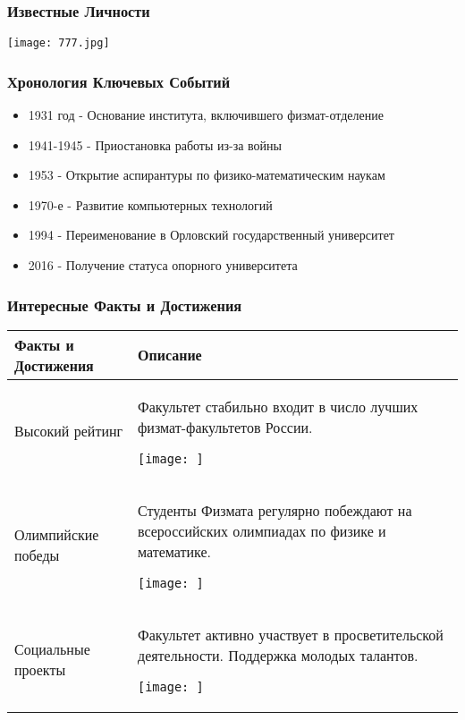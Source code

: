 \documentclass[pdf,hyperref={unicode}, aspectratio=43, serif,11pt]{beamer}
\begin{document}
\begin{frame}
\frametitle{Известные Личности}
\begin{center}
    \texttt{[image: 777.jpg]}
\end{center}
\end{frame}

\begin{frame}
\frametitle{\textbf{Хронология Ключевых Событий}}
\begin{itemize}
{\small Важные даты в истории Физико-математического факультета и его развития.}
    \item {\small 1931 год - Основание института, включившего физмат-отделение}
    \item {\small 1941-1945 - Приостановка работы из-за войны}
    \item {\small 1953 - Открытие аспирантуры по физико-математическим наукам}
    \item {\small 1970-е - Развитие компьютерных технологий}
    \item {\small 1994 - Переименование в Орловский государственный университет}
    \item {\small 2016 - Получение статуса опорного университета}
\end{itemize}
\end{frame}



\begin{frame}
\frametitle{Интересные Факты и Достижения}
\begin{table}[H]
    \centering
    \begin{tabular}{|p{4cm}|p{7.1cm}|}
        \hline
        \cellcolor {Gray} \textbf{Факты и Достижения} & \cellcolor {Gray} \textbf{Описание} \\
        \hline
        Высокий рейтинг & Факультет стабильно входит в число лучших физмат-факультетов России. \begin{center}
            \texttt{[image: ]}
        \end{center}\\
         \hline
        Олимпийские победы & Студенты Физмата регулярно побеждают на всероссийских олимпиадах по физике и математике.
        \begin{center}
            \texttt{[image: ]}
        \end{center}\\
        \hline
        Социальные проекты & Факультет активно участвует в просветительской деятельности. Поддержка молодых талантов.
        \begin{center}
            \texttt{[image: ]}
        \end{center}\\
    \end{tabular}
    \label{tab:my_label}
\end{table}
\end{frame}
\end{document}
